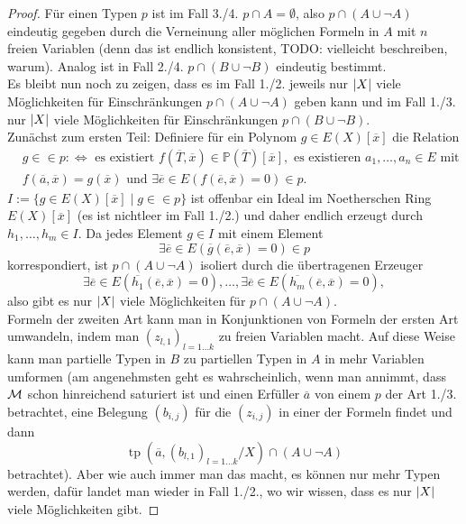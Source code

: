\begin{proof}
	Für einen Typen $p$ ist im Fall 3./4. $p\cap A=\emptyset$, also $p\cap(A\cup\neg A)$ eindeutig gegeben durch die Verneinung aller möglichen Formeln in $A$ mit $n$ freien Variablen (denn das ist endlich konsistent, TODO: vielleicht beschreiben, warum). Analog ist in Fall 2./4. $p\cap(B\cup\neg B)$ eindeutig bestimmt.\\
	Es bleibt nun noch zu zeigen, dass es im Fall 1./2. jeweils nur ${\left| X \right|}$ viele Möglichkeiten für Einschränkungen $p\cap(A\cup\neg A)$ geben kann und im Fall 1./3. nur ${\left| X \right|}$ viele Möglichkeiten für Einschränkungen $p\cap(B\cup\neg B)$.\\
	Zunächst zum ersten Teil: Definiere für ein Polynom $g\in E(X)[\overline{x}]$ die Relation
	\begin{align*}&g\in\in p:\Leftrightarrow\text{ es existiert }f(\overline{T},\overline{x})\in\mathbb{P}(\overline{T})[\overline{x}],\text{ es existieren }a_1,\dots,a_n\in E\text{ mit }\\
	&f(\overline{a},\overline{x})=g(\overline{x})\text{ und }\exists\overline{e}\in E(f(\overline{e},\overline{x})=0)\in p.
	\end{align*}
	$I:=\{g\in E(X)[\overline{x}]\mid g\in\in p\}$ ist offenbar ein Ideal im Noetherschen Ring $E(X)[\overline{x}]$ (es ist nichtleer im Fall 1./2.) und daher endlich erzeugt durch $h_1,\dots,h_m\in I$. Da jedes Element $g\in I$ mit einem Element $$\exists\overline{e}\in E(\overline{g}(\overline{e},\overline{x})=0)\in p$$ korrespondiert, ist $p\cap(A\cup\neg A)$ isoliert durch die übertragenen Erzeuger $$\exists\overline{e}\in E(\overline{h_1}(\overline{e},\overline{x})=0),\dots,\exists\overline{e}\in E(\overline{h_m}(\overline{e},\overline{x})=0),$$ also gibt es nur ${\left| X \right|}$ viele Möglichkeiten für $p\cap(A\cup\neg A)$.\\
	Formeln der zweiten Art kann man in Konjunktionen von Formeln der ersten Art umwandeln, indem man $(z_{l,1})_{l=1\dots k}$ zu freien Variablen macht. Auf diese Weise kann man partielle Typen in $B$ zu partiellen Typen in $A$ in mehr Variablen umformen (am angenehmsten geht es wahrscheinlich, wenn man annimmt, dass $\mathcal{M}$ schon hinreichend saturiert ist und einen Erfüller $\overline{a}$ von einem $p$ der Art 1./3. betrachtet, eine Belegung $(b_{i,j})$ für die $(z_{i,j})$ in einer der Formeln findet und dann $$\operatorname{tp}(\overline{a},(b_{l,1})_{l=1\dots k}/X)\cap(A\cup\neg A)$$ betrachtet). Aber wie auch immer man das macht, es können nur mehr Typen werden, dafür landet man wieder in Fall 1./2., wo wir wissen, dass es nur ${\left| X \right|}$ viele Möglichkeiten gibt.
\end{proof}